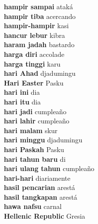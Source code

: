 \textbf{ hampir sampai  } ataká \\
\textbf{ hampir tiba  } acercando \\
\textbf{ hampir-hampir  } kasi \\
\textbf{ hancur lebur  } kibra \\
\textbf{ haram jadah  } bastardo \\
\textbf{ harga diri  } accolade \\
\textbf{ harga tinggi  } karu \\
\textbf{ hari Ahad  } djadumingu \\
\textbf{ Hari Easter  } Pasku \\
\textbf{ hari ini  } dia \\
\textbf{ hari itu  } dia \\
\textbf{ hari jadi  } cumpleaño \\
\textbf{ hari lahir  } cumpleaño \\
\textbf{ hari malam  } skur \\
\textbf{ hari minggu  } djadumingu \\
\textbf{ hari Paskah  } Pasku \\
\textbf{ hari tahun baru  } di \\
\textbf{ hari ulang tahun  } cumpleaño \\
\textbf{ hari-hari  } diariamente \\
\textbf{ hasil pencarian  } arestá \\
\textbf{ hasil tangkapan  } arestá \\
\textbf{ hawa nafsu  } carnal \\
\textbf{ Hellenic Republic  } Gresia \\
